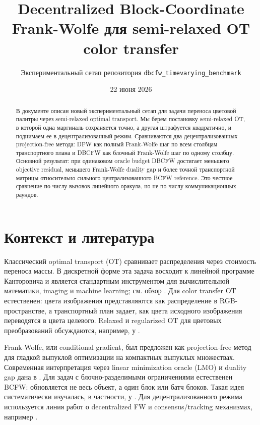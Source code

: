 \documentclass[11pt,a4paper]{article}
\title{\textbf{Decentralized Block-Coordinate Frank-Wolfe для semi-relaxed OT color transfer}}
\author{Экспериментальный сетап репозитория \texttt{dbcfw\_timevarying\_benchmark}}
\date{22 июня 2026}
\newcommand{\1}{\mathbf{1}}
\begin{document}
\maketitle

\begin{abstract}
В документе описан новый экспериментальный сетап для задачи переноса цветовой палитры через semi-relaxed optimal transport. Мы берем постановку semi-relaxed OT, в которой одна маргиналь сохраняется точно, а другая штрафуется квадратично, и поднимаем ее в децентрализованный режим. Сравниваются два децентрализованных projection-free метода: DFW как полный Frank-Wolfe шаг по всем столбцам транспортного плана и DBCFW как блочный Frank-Wolfe шаг по одному столбцу. Основной результат: при одинаковом oracle budget DBCFW достигает меньшего objective residual, меньшего Frank-Wolfe duality gap и более точной транспортной матрицы относительно сильного централизованного BCFW reference. Это честное сравнение по числу вызовов линейного оракула, но не по числу коммуникационных раундов.
\end{abstract}

\section{Контекст и литература}

Классический optimal transport (OT) сравнивает распределения через стоимость переноса массы. В дискретной форме эта задача восходит к линейной программе Канторовича и является стандартным инструментом для вычислительной математики, imaging и machine learning; см. обзор \citet{peyre2019computational}. Для color transfer OT естественен: цвета изображения представляются как распределение в RGB-пространстве, а транспортный план задает, как цвета исходного изображения переводятся в цвета целевого. Relaxed и regularized OT для цветовых преобразований обсуждаются, например, у \citet{ferradans2014regularized}.

Frank-Wolfe, или conditional gradient, был предложен \citet{frank1956algorithm} как projection-free метод для гладкой выпуклой оптимизации на компактных выпуклых множествах. Современная интерпретация через linear minimization oracle (LMO) и duality gap дана в \citet{jaggi2013revisiting}. Для задач с блочно-разделимыми ограничениями естественен BCFW: обновляется не весь объект, а один блок или батч блоков. Такая идея систематически изучалась, в частности, у \citet{lacostejulien2013block}. Для децентрализованного режима используется линия работ о decentralized FW и consensus/tracking механизмах, например \citet{wai2017decentralized}.
\end{document}
